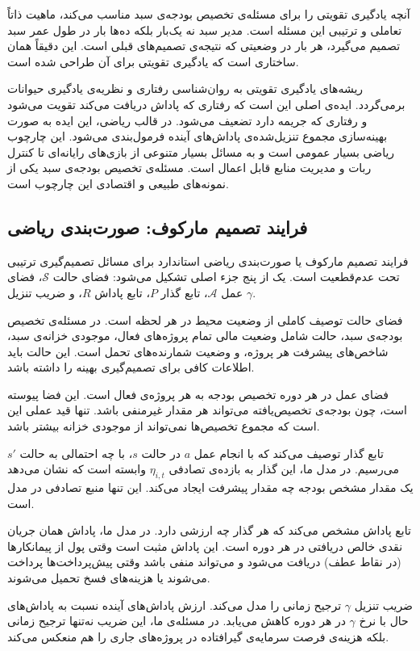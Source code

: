 آنچه یادگیری تقویتی را برای مسئله‌ی تخصیص بودجه‌ی سبد مناسب
می‌کند، ماهیت ذاتاً تعاملی و ترتیبی این مسئله است. مدیر سبد
نه یک‌بار بلکه ده‌ها بار در طول عمر سبد تصمیم می‌گیرد، هر بار
در وضعیتی که نتیجه‌ی تصمیم‌های قبلی است. این دقیقاً همان ساختاری
است که یادگیری تقویتی برای آن طراحی شده است.

ریشه‌های یادگیری تقویتی به روان‌شناسی رفتاری و نظریه‌ی یادگیری
حیوانات برمی‌گردد. ایده‌ی اصلی این است که رفتاری که پاداش دریافت
می‌کند تقویت می‌شود و رفتاری که جریمه دارد تضعیف می‌شود. در
قالب ریاضی، این ایده به صورت بهینه‌سازی مجموع تنزیل‌شده‌ی
پاداش‌های آینده فرمول‌بندی می‌شود. این چارچوب ریاضی بسیار
عمومی است و به مسائل بسیار متنوعی از بازی‌های رایانه‌ای تا
کنترل ربات و مدیریت منابع قابل اعمال است. مسئله‌ی تخصیص
بودجه‌ی سبد یکی از نمونه‌های طبیعی و اقتصادی این چارچوب است.

\subsection{فرایند تصمیم مارکوف: صورت‌بندی ریاضی}
\label{subsec:mdp_basics}

فرایند تصمیم مارکوف یا  صورت‌بندی ریاضی استاندارد برای
مسائل تصمیم‌گیری ترتیبی تحت عدم‌قطعیت است. یک  از پنج
جزء اصلی تشکیل می‌شود: فضای حالت $\mathcal{S}$، فضای عمل
$\mathcal{A}$، تابع گذار $P$، تابع پاداش $R$، و ضریب تنزیل
$\gamma$.

فضای حالت توصیف کاملی از وضعیت محیط در هر لحظه است. در مسئله‌ی
تخصیص بودجه‌ی سبد، حالت شامل وضعیت مالی تمام پروژه‌های فعال،
موجودی خزانه‌ی سبد، شاخص‌های پیشرفت هر پروژه، و وضعیت
شمارنده‌های تحمل است. این حالت باید اطلاعات کافی برای تصمیم‌گیری
بهینه را داشته باشد.

فضای عمل در هر دوره تخصیص بودجه به هر پروژه‌ی فعال است. این
فضا پیوسته است، چون بودجه‌ی تخصیص‌یافته می‌تواند هر مقدار
غیرمنفی باشد. تنها قید عملی این است که مجموع تخصیص‌ها نمی‌تواند
از موجودی خزانه بیشتر باشد.

تابع گذار توصیف می‌کند که با انجام عمل $a$ در حالت $s$، با چه
احتمالی به حالت $s'$ می‌رسیم. در مدل ما، این گذار به
بازده‌ی تصادفی $\eta_{i,t}$ وابسته است که نشان می‌دهد یک
مقدار مشخص بودجه چه مقدار پیشرفت ایجاد می‌کند. این تنها منبع
تصادفی در مدل است.

تابع پاداش مشخص می‌کند که هر گذار چه ارزشی دارد. در مدل ما،
پاداش همان جریان نقدی خالص دریافتی در هر دوره است. این پاداش
مثبت است وقتی پول از پیمانکارها (در نقاط عطف) دریافت می‌شود
و می‌تواند منفی باشد وقتی پیش‌پرداخت‌ها پرداخت می‌شوند یا
هزینه‌های فسخ تحمیل می‌شوند.

ضریب تنزیل $\gamma$ ترجیح زمانی را مدل می‌کند. ارزش پاداش‌های
آینده نسبت به پاداش‌های حال با نرخ $\gamma$ در هر دوره کاهش
می‌یابد. در مسئله‌ی ما، این ضریب نه‌تنها ترجیح زمانی بلکه
هزینه‌ی فرصت سرمایه‌ی گیرافتاده در پروژه‌های جاری را هم
منعکس می‌کند.


